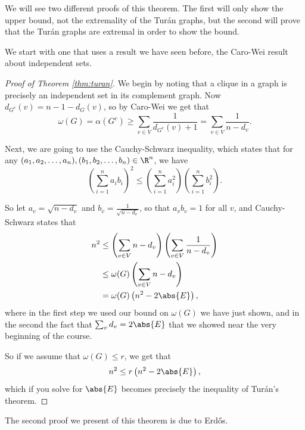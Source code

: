 \documentclass[nobib]{tufte-handout}
\begin{document}
We will see two different proofs of this theorem. The first will only show the upper bound, not the extremality of the Turán graphs, but the second will prove that the Turán graphs are extremal in order to show the bound.

We start with one that uses a result we have seen before, the Caro-Wei result about independent sets.

\begin{proof}[Proof of Theorem \ref{thm:turan}]
    We begin by noting that a clique in a graph is precisely an independent set in its complement graph. Now $d_{G^c}(v) = n - 1 - d_{G}(v)$, so by Caro-Wei we get that
    $$\omega(G) = \alpha\left(G^c\right) \geq \sum_{v \in V} \frac{1}{d_{G^c}(v) + 1} = \sum_{v \in V} \frac{1}{n - d_v}.$$

    Next, we are going to use the Cauchy-Schwarz inequality, which states that for any $(a_1, a_2,\ldots, a_n), (b_1, b_2, \ldots, b_n) \in \R^n$, we have
    $$\left(\sum_{i=1}^{n} a_i b_i\right)^2 \leq \left(\sum_{i=1}^{n} a_i^2\right)\left(\sum_{i=1}^{n} b_i^2\right).$$

    So let $a_v = \sqrt{n - d_v}$ and $b_v = \frac{1}{\sqrt{n - d_v}}$, so that $a_v b_v = 1$ for all $v$, and Cauchy-Schwarz states that
    \begin{align*}
        n^2 &\leq \left(\sum_{v \in V} n - d_v\right)\left(\sum_{v \in V} \frac{1}{n - d_v}\right)\\
        &\leq \omega(G)\left(\sum_{v \in V} n - d_v\right)\\
        &= \omega(G)\left(n^2 - 2\abs{E}\right),
    \end{align*}
    where in the first step we used our bound on $\omega(G)$ we have just shown, and in the second the fact that $\sum_v d_v = 2\abs{E}$ that we showed near the very beginning of the course.

    So if we assume that $\omega(G) \leq r$, we get that
    $$n^2 \leq r\left(n^2 - 2\abs{E}\right),$$
    which if you solve for $\abs{E}$ becomes precisely the inequality of Turán's theorem.
\end{proof}

The second proof we present of this theorem is due to Erd\H{o}s.
\end{document}
